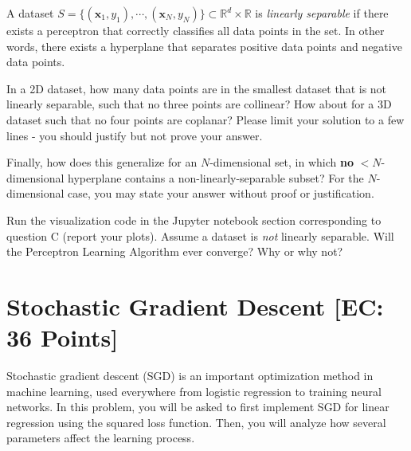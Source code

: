 \begin{problem}[4]
  A dataset $S = \{(\mathbf{x}_1, y_1),\cdots,(\mathbf{x}_N, y_N)\} \subset \mathbb{R}^d \times \mathbb{R}$ is \emph{linearly separable} if there exists a perceptron that correctly classifies all data points in the set. In other words, there exists a hyperplane that separates positive data points and negative data points.

  In a 2D dataset, how many data points are in the smallest dataset that is not linearly separable, such that no three points are collinear? How about for a 3D dataset such that no four points are coplanar? Please limit your solution to a few lines - you should justify but not prove your answer.

  Finally, how does this generalize for an $N$-dimensional set, in which \textbf{no} $<$$N$-dimensional hyperplane contains a non-linearly-separable subset? For the $N$-dimensional case, you may state your answer without proof or justification.
\end{problem}
\begin{solution}

\end{solution}

\begin{problem}[2]
  Run the visualization code in the Jupyter notebook section corresponding to question C (report your plots). Assume a dataset is \emph{not} linearly separable. Will the Perceptron Learning Algorithm ever converge? Why or why not?
\end{problem}
\begin{solution}

\end{solution}




\newpage
\section{Stochastic Gradient Descent [EC: 36 Points]}

Stochastic gradient descent (SGD) is an important optimization method in machine learning, used everywhere from logistic regression to training neural networks. In this problem, you will be asked to first implement SGD for linear regression using the squared loss function. Then, you will analyze how several parameters affect the learning process.

